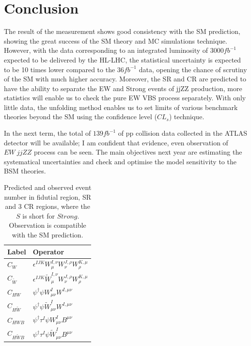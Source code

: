 \documentclass[12pt]{article}
\begin{document}
    \section{Conclusion}
        \par The result of the measurement shows good consistency with the SM prediction, showing the great success of 
        the SM theory and MC simulations technique. However, with the data corresponding to an integrated luminosity 
        of $3000fb^{-1}$ expected to be delivered by the HL-LHC\cite{ATL-PHYS-PUB-2019-005}, the statistical uncertainty 
        is expected to be 10 times lower compared to the $36fb^{-1}$ data, opening the chance of scrutiny of the SM with 
        much higher accuracy. Moreover, the SR and CR are predicted to have the ability to separate the EW and Strong 
        events of jjZZ production, more statistics will enable us to check the pure EW VBS process separately. 
        With only little data, the unfolding method enables us to set limits of various benchmark theories beyond the 
        SM using the confidence level ($CL_s$) technique\cite{Read_2002}. 
        \par In the next term, the total of $139fb^{-1}$ of pp collision data collected in the ATLAS detector will be available; I am
        confident that evidence, even observation of $EW\ jjZZ$ process can be seen.
        The main objectives next year are estimating the systematical uncertainties and check and optimise the model sensitivity 
        to the BSM theories. 
        \begin{table}[ht!]
            \centering
            \renewcommand\arraystretch{1.2}
            \begin{tabularx}{\textwidth}{p{} p{}}
            \hline\hline
            Label           & Operator \\
            \hline
            $C_W$               & $\epsilon^{IJK}W_\mu^{I,\nu}W_{\nu}^{J,\rho}W_{\rho}^{K,\mu}$ \\
            $C_{\tilde{W}}$     & $\epsilon^{IJK}\tilde{W}_\mu^{I,\nu}W_{\nu}^{J,\rho}W_{\rho}^{K,\mu}$ \\
            \hline
            $C_{HW}$            & ${\psi^\dagger}{\psi}W_{\mu\nu}^IW^{I,\mu\nu}$ \\
            $C_{H\tilde{W}}$    & ${\psi^\dagger}{\psi}\tilde{W}_{\mu\nu}^IW^{I,\mu\nu}$ \\
            \hline
            $C_{HWB}$           & ${\psi^\dagger}\tau^I{\psi}W_{\mu\nu}^IB^{\mu\nu}$ \\
            $C_{H\tilde{W}B}$   & ${\psi^\dagger}\tau^I{\psi}\tilde{W}_{\mu\nu}^IB^{\mu\nu}$ \\           
            \hline\hline
            \end{tabularx}
            \caption{Predicted and observed event number in fidutial region, SR and 3 CR regions, where the $S$ is short for $Strong$. Observation is compatible with the SM prediction. }
            \label{regevtstable}
        \end{table}
    
    
    
\end{document}
